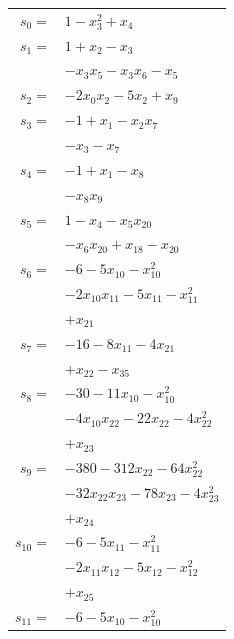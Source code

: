 \begingroup
\small
\setlength{\tabcolsep}{2pt}
\setlength{\LTleft}{0pt}
\begin{longtable}{@{}r@{\;}l@{}}
\(s_{0}=\) & \(\displaystyle 1 -x_{3}^{2} +x_{4}\) \\[3pt]
\(s_{1}=\) & \(\displaystyle 1 +x_{2} -x_{3}\) \\
 & \(\displaystyle -x_{3}x_{5} -x_{3}x_{6} -x_{5}\) \\[3pt]
\(s_{2}=\) & \(\displaystyle -2x_{0}x_{2} -5x_{2} +x_{9}\) \\[3pt]
\(s_{3}=\) & \(\displaystyle -1 +x_{1} -x_{2}x_{7}\) \\
 & \(\displaystyle -x_{3} -x_{7}\) \\[3pt]
\(s_{4}=\) & \(\displaystyle -1 +x_{1} -x_{8}\) \\
 & \(\displaystyle -x_{8}x_{9}\) \\[3pt]
\(s_{5}=\) & \(\displaystyle 1 -x_{4} -x_{5}x_{20}\) \\
 & \(\displaystyle -x_{6}x_{20} +x_{18} -x_{20}\) \\[3pt]
\(s_{6}=\) & \(\displaystyle -6 -5x_{10} -x_{10}^{2}\) \\
 & \(\displaystyle -2x_{10}x_{11} -5x_{11} -x_{11}^{2}\) \\
 & \(\displaystyle +x_{21}\) \\[3pt]
\(s_{7}=\) & \(\displaystyle -16 -8x_{11} -4x_{21}\) \\
 & \(\displaystyle +x_{22} -x_{35}\) \\[3pt]
\(s_{8}=\) & \(\displaystyle -30 -11x_{10} -x_{10}^{2}\) \\
 & \(\displaystyle -4x_{10}x_{22} -22x_{22} -4x_{22}^{2}\) \\
 & \(\displaystyle +x_{23}\) \\[3pt]
\(s_{9}=\) & \(\displaystyle -380 -312x_{22} -64x_{22}^{2}\) \\
 & \(\displaystyle -32x_{22}x_{23} -78x_{23} -4x_{23}^{2}\) \\
 & \(\displaystyle +x_{24}\) \\[3pt]
\(s_{10}=\) & \(\displaystyle -6 -5x_{11} -x_{11}^{2}\) \\
 & \(\displaystyle -2x_{11}x_{12} -5x_{12} -x_{12}^{2}\) \\
 & \(\displaystyle +x_{25}\) \\[3pt]
\(s_{11}=\) & \(\displaystyle -6 -5x_{10} -x_{10}^{2}\) \\

\end{longtable}
